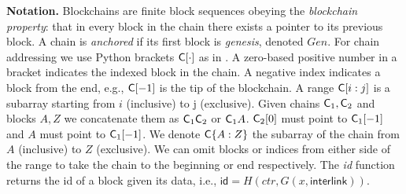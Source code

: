 \noindent
\textbf{Notation.}
Blockchains are finite
block sequences obeying the \emph{blockchain property}: that in every block in
the chain there exists a pointer to its previous block. A chain is
\emph{anchored} if its first block is \emph{genesis}, denoted $Gen$.
For chain addressing we use Python brackets $\mathsf{C}[\cdot]$ as in
\cite{fruitchains}. A zero-based positive number in a bracket indicates the
indexed block in the chain. A negative index indicates a block from the end,
e.g., $\mathsf{C}[-1]$ is the tip of the blockchain. A range $\mathsf{C}[i:j]$ is a
subarray starting from $i$ (inclusive) to j (exclusive).
Given chains $\mathsf{C}_1, \mathsf{C}_2$ and blocks $A, Z$ we concatenate them as
$\mathsf{C}_1 \mathsf{C}_2$ or $\mathsf{C}_1 A$. $\mathsf{C}_2[0]$ must point to $\mathsf{C}_1[-1]$
and $A$ must point to $\mathsf{C}_1[-1]$. We denote $\mathsf{C}\{A:Z\}$ the subarray of
the chain from $A$ (inclusive) to $Z$ (exclusive). We can omit blocks or indices
from either side of the range to take the chain to the beginning or end
respectively.
The \emph{id} function
returns the id of a block given its data, i.e., $\textsf{id} = H(ctr, G(x,
\textsf{interlink}))$.
